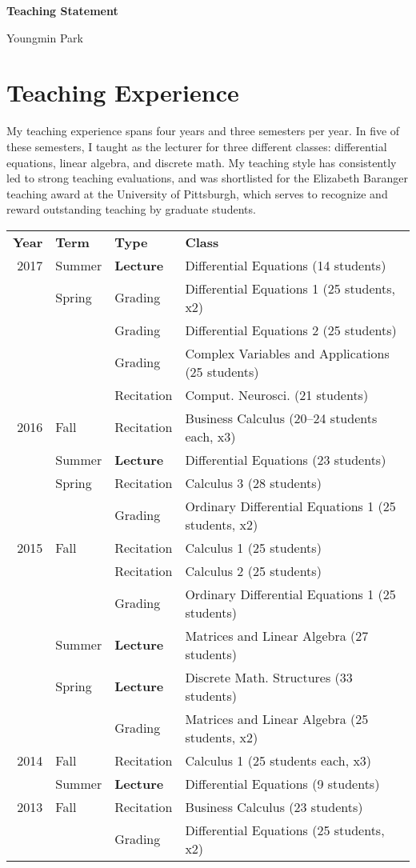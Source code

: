 \documentclass[a4paper,11pt]{article}
\begin{document}
\begin{center}
\Large \textbf{Teaching Statement}

\Large Youngmin Park
\end{center}

\section{Teaching Experience}

My teaching experience spans four years and three semesters per year. In five of these semesters, I taught as the lecturer for three different classes: differential equations, linear algebra, and discrete math. My teaching style has consistently led to strong teaching evaluations, and was shortlisted for the Elizabeth Baranger teaching award at the University of Pittsburgh, which serves to recognize and reward outstanding teaching by graduate students.

\begin{longtable}{rlll}
\textbf{Year} & \textbf{Term} & \textbf{Type} & \textbf{Class}\\
2017 & Summer& \textbf{Lecture} &  Differential Equations (14 students)\\
     & Spring & Grading &  Differential Equations 1 (25 students, x2)\\
     & & Grading & Differential Equations 2 (25 students)\\
     & & Grading & Complex Variables and Applications (25 students)\\
     & & Recitation & Comput. Neurosci. (21 students)\\
2016 & Fall & Recitation & Business Calculus (20--24 students each, x3)\\
     & Summer & \textbf{Lecture} & Differential Equations (23 students)\\
     & Spring & Recitation & Calculus 3 (28 students)\\
     & & Grading & Ordinary Differential Equations 1 (25 students, x2)\\
2015 & Fall & Recitation & Calculus 1 (25 students)\\
 &  & Recitation & Calculus 2 (25 students)\\
 &  & Grading & Ordinary Differential Equations 1 (25 students)\\
 & Summer & \textbf{Lecture} & Matrices and Linear Algebra (27 students)\\
 & Spring & \textbf{Lecture} & Discrete Math. Structures (33 students)\\
 & & Grading & Matrices and Linear Algebra (25 students, x2)\\
2014 & Fall & Recitation & Calculus 1 (25 students each, x3)\\
 & Summer & \textbf{Lecture} & Differential Equations (9 students)\\
2013 & Fall & Recitation &  Business Calculus (23 students)\\
 & & Grading & Differential Equations (25 students, x2)\\
\end{longtable}
\end{document}
